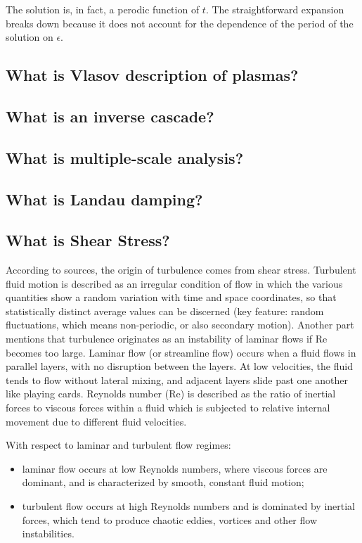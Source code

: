 The solution is, in fact, a perodic function of $t$. The straightforward expansion breaks down because it does not account for the dependence of the period of the solution on $\epsilon$. 

\subsection{What is Vlasov description of plasmas?}

\subsection{What is an inverse cascade?}

\subsection{What is multiple-scale analysis?}

\subsection{What is Landau damping?}

\subsection{What is Shear Stress?}
According to sources, the origin of turbulence comes from shear stress. Turbulent fluid motion is described as an irregular condition of flow in which the various quantities show a random variation with time and space coordinates, so that statistically distinct average values can be discerned (key feature: random fluctuations, which means non-periodic, or also secondary motion). Another part mentions that turbulence originates as an instability of laminar flows if Re becomes too large. Laminar flow (or streamline flow) occurs when a fluid flows in parallel layers, with no disruption between the layers. At low velocities, the fluid tends to flow without lateral mixing, and adjacent layers slide past one another like playing cards. Reynolds number (Re) is described as the ratio of inertial forces to viscous forces within a fluid which is subjected to relative internal movement due to different fluid velocities. 

\shear

With respect to laminar and turbulent flow regimes:
\begin{itemize}
	\item laminar flow occurs at low Reynolds numbers, where viscous forces are dominant, and is characterized by smooth, constant fluid motion;
	\item turbulent flow occurs at high Reynolds numbers and is dominated by inertial forces, which tend to produce chaotic eddies, vortices and other flow instabilities.
\end{itemize} 

